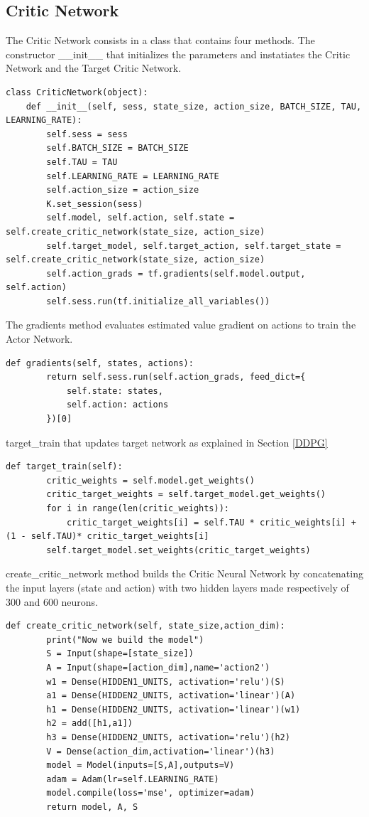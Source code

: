 \documentclass[binding=0.6cm,Lau,oneside]{sapthesis} %
\begin{document}
\subsection{Critic Network}
The Critic Network consists in a class that contains four methods.
The constructor \_\_init\_\_ that initializes the parameters and instatiates the Critic Network and the Target Critic Network.
\begin{lstlisting}
class CriticNetwork(object):
    def __init__(self, sess, state_size, action_size, BATCH_SIZE, TAU, LEARNING_RATE):
        self.sess = sess
        self.BATCH_SIZE = BATCH_SIZE
        self.TAU = TAU
        self.LEARNING_RATE = LEARNING_RATE
        self.action_size = action_size
        K.set_session(sess)
        self.model, self.action, self.state = self.create_critic_network(state_size, action_size)  
        self.target_model, self.target_action, self.target_state = self.create_critic_network(state_size, action_size)  
        self.action_grads = tf.gradients(self.model.output, self.action)
        self.sess.run(tf.initialize_all_variables())
\end{lstlisting}
The gradients method evaluates estimated value gradient on actions to train the Actor Network.
\begin{lstlisting}[firstnumber=13]
    def gradients(self, states, actions):
        return self.sess.run(self.action_grads, feed_dict={
            self.state: states,
            self.action: actions
        })[0]
\end{lstlisting}
target\_train that updates target network as explained in Section \ref{DDPG}
\begin{lstlisting}[firstnumber=18]
    def target_train(self):
        critic_weights = self.model.get_weights()
        critic_target_weights = self.target_model.get_weights()
        for i in range(len(critic_weights)):
            critic_target_weights[i] = self.TAU * critic_weights[i] + (1 - self.TAU)* critic_target_weights[i]
        self.target_model.set_weights(critic_target_weights)
\end{lstlisting}
create\_critic\_network method builds the Critic Neural Network by concatenating the input layers (state and action) with two hidden layers made respectively of 300 and 600 neurons.
\begin{lstlisting}[firstnumber=24]
    def create_critic_network(self, state_size,action_dim):
        print("Now we build the model")
        S = Input(shape=[state_size])  
        A = Input(shape=[action_dim],name='action2')   
        w1 = Dense(HIDDEN1_UNITS, activation='relu')(S)
        a1 = Dense(HIDDEN2_UNITS, activation='linear')(A) 
        h1 = Dense(HIDDEN2_UNITS, activation='linear')(w1)
        h2 = add([h1,a1])    
        h3 = Dense(HIDDEN2_UNITS, activation='relu')(h2)
        V = Dense(action_dim,activation='linear')(h3)   
        model = Model(inputs=[S,A],outputs=V)
        adam = Adam(lr=self.LEARNING_RATE)
        model.compile(loss='mse', optimizer=adam)
        return model, A, S 
\end{lstlisting}







\backmatter

\cleardoublepage
{} %
\end{document}
